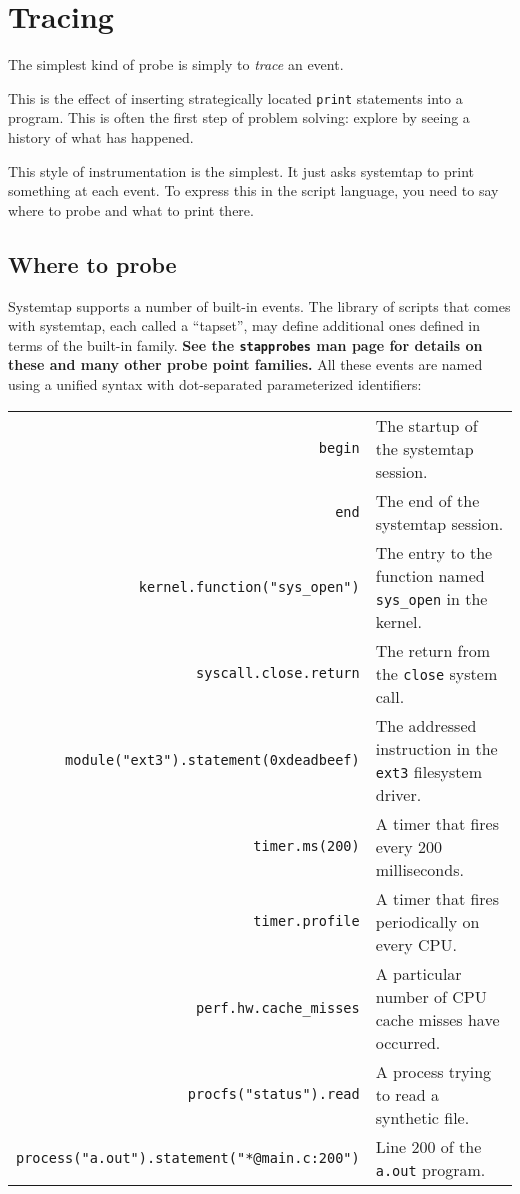 \documentclass{article}
\renewcommand{\nomenclature}[2]{}
\begin{document}
\section{Tracing}

The simplest kind of probe is simply to {\em trace} an event.
\nomenclature{trace}{A compact textual record of an event occurrence.}
This is the effect of inserting strategically located \verb+print+
statements into a program.  This is often the first step of problem
solving: explore by seeing a history of what has happened.

This style of instrumentation is the simplest.  It just asks systemtap
to print something at each event.  To express this in the script
language, you need to say where to probe and what to print there.

\subsection{Where to probe}

Systemtap supports a number of built-in events.  The library of
scripts that comes with systemtap, each called a ``tapset'', may
define additional ones defined in terms of the built-in family.  {\bf See
the \verb+stapprobes+ man page for details on these and many other
probe point families.}  \nomenclature{tapset}{A reusable script forming
  part of the automatically searched tapset library.}  All these
events are named using a unified syntax with dot-separated
parameterized identifiers:

\begin{tabular}{rl}
\verb+begin+ & The startup of the systemtap session. \\
\verb+end+ & The end of the systemtap session. \\
\verb+kernel.function("sys_open")+ & The entry to the function named
\verb+sys_open+ in the kernel. \\
\verb+syscall.close.return+ & The return from the \verb+close+ system
call. \\
\verb+module("ext3").statement(0xdeadbeef)+ & The addressed instruction
in the \verb+ext3+ filesystem driver. \\
\verb+timer.ms(200)+ & A timer that fires every 200 milliseconds. \\
\verb+timer.profile+ & A timer that fires periodically on every CPU. \\
\verb+perf.hw.cache_misses+ & A particular number of CPU cache misses have occurred.  \\
\verb+procfs("status").read+ & A process trying to read a synthetic file. \\
\verb+process("a.out").statement("*@main.c:200")+ & Line 200 of the \verb+a.out+ program.
\end{tabular}
\end{document}
